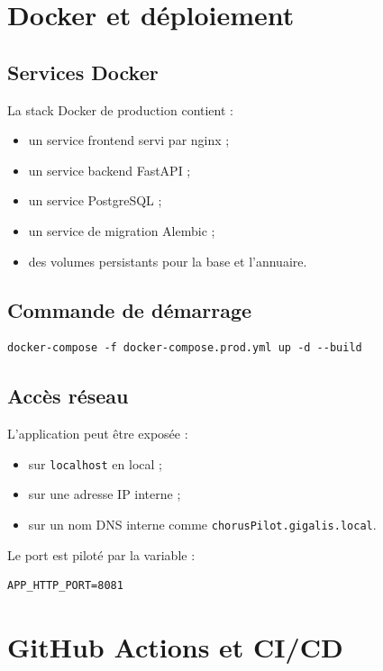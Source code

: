\documentclass[11pt,a4paper]{article}
\begin{document}
\section{Docker et déploiement}

\subsection{Services Docker}

La stack Docker de production contient :

\begin{itemize}
  \item un service frontend servi par nginx ;
  \item un service backend FastAPI ;
  \item un service PostgreSQL ;
  \item un service de migration Alembic ;
  \item des volumes persistants pour la base et l'annuaire.
\end{itemize}

\subsection{Commande de démarrage}

\begin{lstlisting}
docker-compose -f docker-compose.prod.yml up -d --build
\end{lstlisting}

\subsection{Accès réseau}

L'application peut être exposée :

\begin{itemize}
  \item sur \texttt{localhost} en local ;
  \item sur une adresse IP interne ;
  \item sur un nom DNS interne comme \texttt{chorusPilot.gigalis.local}.
\end{itemize}

Le port est piloté par la variable :

\begin{lstlisting}
APP_HTTP_PORT=8081
\end{lstlisting}

\section{GitHub Actions et CI/CD}
\end{document}
